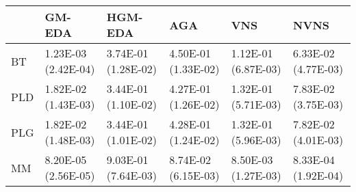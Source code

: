 \begin{tabular}{llllll}
\toprule
{} &               GM-EDA &              HGM-EDA &                  AGA &                  VNS &                 NVNS \\
\midrule
BT  &  1.23E-03 (2.42E-04) &  3.74E-01 (1.28E-02) &  4.50E-01 (1.33E-02) &  1.12E-01 (6.87E-03) &  6.33E-02 (4.77E-03) \\
PLD &  1.82E-02 (1.43E-03) &  3.44E-01 (1.10E-02) &  4.27E-01 (1.26E-02) &  1.32E-01 (5.71E-03) &  7.83E-02 (3.75E-03) \\
PLG &  1.82E-02 (1.48E-03) &  3.44E-01 (1.01E-02) &  4.28E-01 (1.24E-02) &  1.32E-01 (5.96E-03) &  7.82E-02 (4.01E-03) \\
MM  &  8.20E-05 (2.56E-05) &  9.03E-01 (7.64E-03) &  8.74E-02 (6.15E-03) &  8.50E-03 (1.27E-03) &  8.33E-04 (1.92E-04) \\
\bottomrule
\end{tabular}
